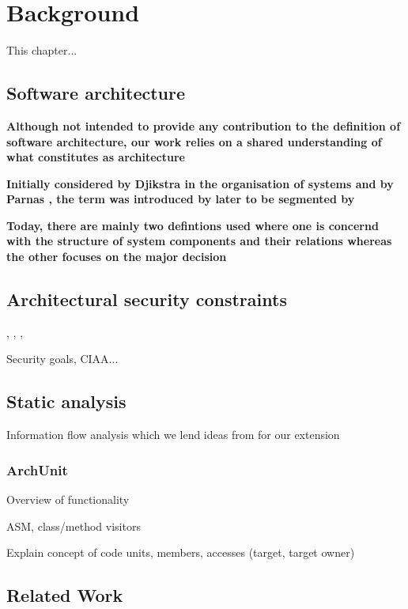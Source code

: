 \chapter{Background}

This chapter...

\section{Software architecture}
\textbf{Although not intended to provide any contribution to the definition of software architecture, our work relies on a shared understanding of what constitutes as architecture}

\textbf{Initially considered by Djikstra in the organisation of systems and by Parnas \cite{broy_criteria_1972, parnas_design_1976}, the term was introduced by \cite{perry_foundations_1992} later to be segmented by \cite{ambriola_introduction_1993}}

\textbf{Today, there are mainly two defintions used where one is concernd with the structure of system components and their relations \cite{bass_software_2013} whereas the other focuses on the major decision \cite{jansen_software_2005}}



\section{Architectural security constraints}
\cite{broy_software_2007}, \cite{felderer_security_2016}, \cite{haley_security_2008}, 

Security goals, CIAA...

\section{Static analysis}

Information flow analysis \cite{hutchison_information_2005} which we lend ideas from for our extension

\subsection{ArchUnit}\label{archunit-back-section}

Overview of functionality

ASM, class/method visitors

Explain concept of code units, members, accesses (target, target owner)

\section{Related Work}

